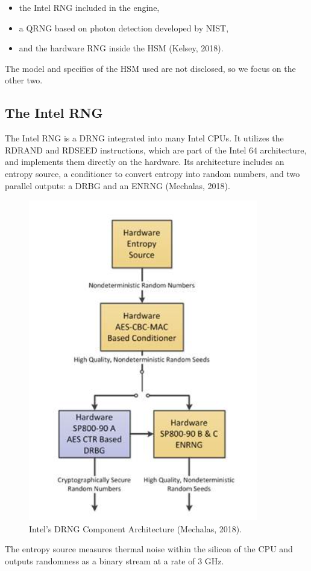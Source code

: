 \begin{itemize}
    \item the Intel RNG included in the engine,
    \item a QRNG based on photon detection developed by NIST,
    \item and the hardware RNG inside the HSM (Kelsey, 2018).
\end{itemize}

The model and specifics of the HSM used are not disclosed, so we focus on the other two.

\subsection{The Intel RNG}
The Intel RNG is a DRNG integrated into many Intel CPUs. It utilizes the RDRAND and RDSEED instructions, which are part of the Intel 64 architecture, and implements them directly on the hardware. Its architecture includes an entropy source, a conditioner to convert entropy into random numbers, and two parallel outputs: a DRBG and an ENRNG (Mechalas, 2018).

\begin{figure}[h]
    \centering
    \includegraphics[width=\columnwidth]{images/IntelDRNPipeline.PNG}
    \caption{Intel’s DRNG Component Architecture (Mechalas, 2018).}
    \label{fig:beacon-architecture}
\end{figure}
The entropy source measures thermal noise within the silicon of the CPU and outputs randomness as a binary stream at a rate of 3 GHz.

